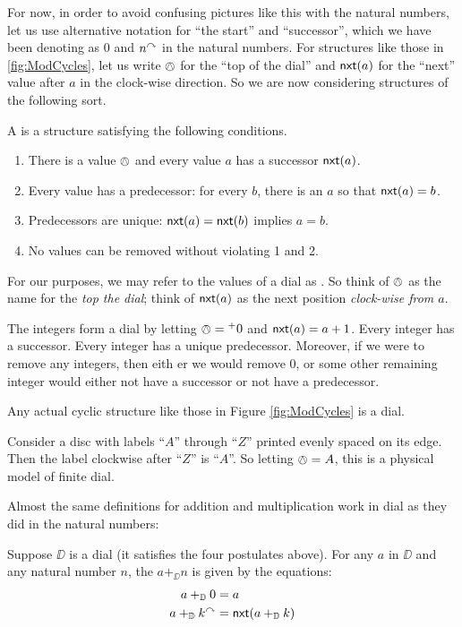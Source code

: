 For now, in order to avoid confusing pictures like this with the natural numbers, let us use alternative notation for ``the start'' and ``successor'', which we have been denoting as $0$ and $n^\curvearrowright$ in the natural numbers.
For structures like those in \ref{fig:ModCycles}, let us write $\owedge$ for the ``top of the dial'' and $\mathord{\textsf{nxt}}(a)$ for the ``next'' value after $a$ in the clock-wise direction. So we are now considering structures of the following sort.

\begin{defn}
	A  is a structure satisfying the following conditions.
\begin{enumerate}
	\item There is a value $\owedge$ and every value $a$ has a successor $\mathord{\textsf{nxt}}(a)$.
	\item Every value has a predecessor: for every $b$, there is an $a$ so that $\mathord{\textsf{nxt}}(a) = b$.
	\item Predecessors are unique: $\mathord{\textsf{nxt}}(a) = \mathord{\textsf{nxt}}(b)$ implies $a=b$.
	\item No values can be removed without violating 1 and 2.
\end{enumerate}

For our purposes, we may refer to the values of a dial as . So think of $\owedge$ as the name for the \emph{top the dial}; think of $\mathord{\textsf{nxt}}(a)$ as the next position \emph{clock-wise from $a$}. 
\end{defn}

\begin{example}
The integers form a dial by letting $\owedge={}^+0$ and $\mathord{\textsf{nxt}}(a)=a+1$.
Every integer has a successor. Every integer has a unique predecessor. Moreover, if we were to remove any integers, then eith er we would remove $0$, or some other remaining integer would either not have a successor or not have a predecessor.

Any actual cyclic structure like those in Figure \ref{fig:ModCycles} is a dial.

Consider a disc with labels ``$A$'' through ``$Z$'' printed evenly spaced on its edge. Then the label clockwise after ``$Z$'' is ``$A$''. So letting $\owedge = A$, this is a physical model of finite dial.
\end{example}  

Almost the same definitions for addition and multiplication work in dial as they did in the natural numbers:

\begin{defn}
	Suppose $\DD$ is a dial (it satisfies the four postulates above). For any $a$ in $\DD$ and any natural number $n$, the  $a+_\DD n$ is given by the equations:
	\begin{align*}
		a +_{\mathbb D} 0 &= a\\
		a +_{\mathbb D} k^\curvearrowright &= \mathord{\textsf{nxt}}(a+_{\mathbb D} k)
	\end{align*}
\end{defn}


